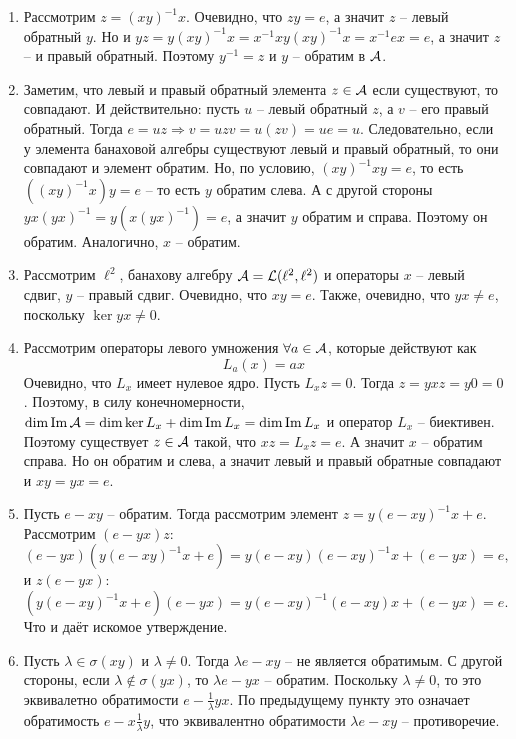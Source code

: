 \begin{solution}
    \begin{enumerate}
        \item Рассмотрим $z = (xy)^{-1}x$. Очевидно, что $zy = e$, а значит $z$ -- левый обратный $y$. Но и $yz = y (xy)^{-1}x = x^{-1}xy(xy)^{-1}x = x^{-1}ex = e$, а значит $z$ -- и правый обратный. Поэтому $y^{-1} = z$ и $y$ -- обратим в $\mathcal{A}$.
        \item Заметим, что левый и правый обратный элемента $z \in \mathcal{A}$ если существуют, то совпадают.
        И действительно: пусть $u$ -- левый обратный $z$, а $v$ -- его правый обратный.
        Тогда $e = uz \Rightarrow v = uzv = u(zv) = ue = u$.
        Следовательно, если у элемента банаховой алгебры существуют левый и правый обратный, то они совпадают и элемент обратим.
        Но, по условию, $(xy)^{-1}xy = e$, то есть $((xy)^{-1}x)y = e$ -- то есть $y$ обратим слева.
        А с другой стороны $yx(yx)^{-1} = y(x(yx)^{-1}) = e$, а значит $y$ обратим и справа.
        Поэтому он обратим. Аналогично, $x$ -- обратим.
        \item Рассмотрим $\ell^2$, банахову алгебру $\mathcal{A} = \mathcal{L}(\ell^2, \ell^2)$ и операторы $x$ -- левый сдвиг, $y$ -- правый сдвиг.
        Очевидно, что $xy = e$. Также, очевидно, что $yx \neq e$, поскольку $\ker yx \neq 0$.
        \item Рассмотрим операторы левого умножения $\forall a \in \mathcal{A}$, которые действуют как
        \[
            L_a(x) = ax
        \]  
        Очевидно, что $L_x$ имеет нулевое ядро. Пусть $L_x z = 0$.
        Тогда $z = yxz = y0 = 0$.
        Поэтому, в силу конечномерности, $\dim \operatorname{Im} \mathcal{A} = \dim \ker L_x + \dim \operatorname{Im} L_x = \dim \operatorname{Im} L_x$ и оператор $L_x$ -- биективен.
        Поэтому существует $z \in \mathcal{A}$ такой, что $xz = L_x z = e$.
        А значит $x$ -- обратим справа.
        Но он обратим и слева, а значит левый и правый обратные совпадают и $xy = yx = e$.
        \item Пусть $e - xy$ -- обратим.
        Тогда рассмотрим элемент $z = y(e - xy)^{-1}x + e$.
        Рассмотрим $(e - yx)z\colon$
        \[
            (e - yx)\left(y(e - xy)^{-1}x + e\right) = y(e - xy)(e - xy)^{-1}x + (e - yx) = e,
        \]
        и $z(e - yx)\colon$
        \[
            \left(y(e - xy)^{-1}x + e\right)(e - yx) = y(e - xy)^{-1}(e - xy)x + (e - yx) = e.
        \]
        Что и даёт искомое утверждение.
        \item Пусть $\lambda \in \sigma(xy)$ и $\lambda \neq 0$. Тогда $\lambda e - xy$ -- не является обратимым. С другой стороны, если $\lambda \notin \sigma(yx)$, то $\lambda e - yx$ -- обратим. Поскольку $\lambda \neq 0$, то это эквивалетно обратимости $e - \frac{1}{\lambda}yx$. По предыдущему пункту это означает обратимость $e - x \frac{1}{\lambda }y$, что эквивалентно обратимости $\lambda e - xy$ -- противоречие. 

\end{enumerate}
\end{solution}
